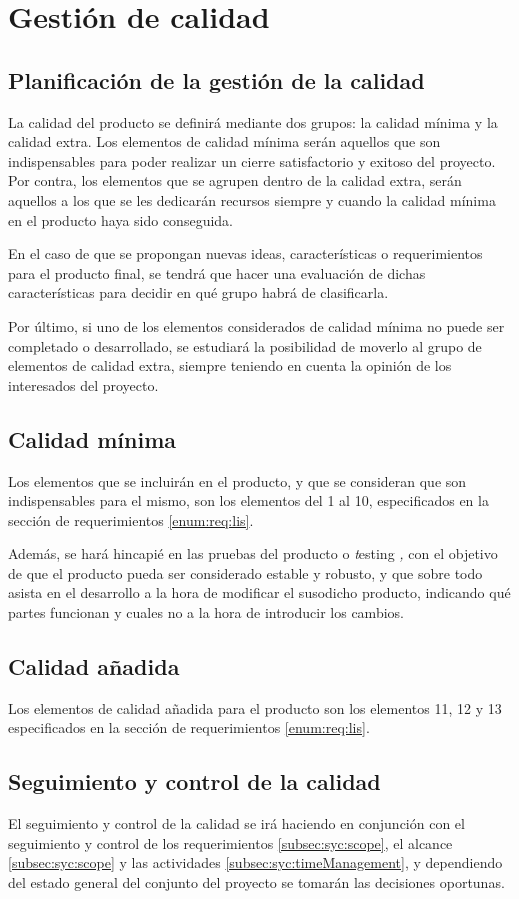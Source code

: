 \section{Gestión de calidad}
\subsection{Planificación de la gestión de la calidad}
La calidad del producto se definirá mediante dos grupos: la calidad
mínima y la calidad extra. Los elementos de calidad mínima serán
aquellos que son indispensables para poder realizar un cierre
satisfactorio y exitoso del proyecto. Por contra, los elementos que se
agrupen dentro de la calidad extra, serán aquellos a los que se les
dedicarán recursos siempre y cuando la calidad mínima en el producto
haya sido conseguida.

En el caso de que se propongan nuevas ideas, características o
requerimientos para el producto final, se tendrá que hacer una
evaluación de dichas características para decidir en qué grupo habrá de
clasificarla.

Por último, si uno de los elementos considerados de calidad mínima no
puede ser completado o desarrollado, se estudiará la posibilidad de
moverlo al grupo de elementos de calidad extra, siempre teniendo en
cuenta la opinión de los interesados del proyecto.

\subsection{Calidad mínima}
\label{sec:min:qual}
Los elementos que se incluirán en el producto, y que se consideran que
son indispensables para el mismo, son los elementos del 1 al 10, especificados 
en la sección de requerimientos \ref{enum:req:lis}.

Además, se hará hincapié en las pruebas del producto o \textit testing \textit,
con el objetivo de que el producto pueda ser considerado estable y robusto, y
que sobre todo asista en el desarrollo a la hora de modificar el susodicho
producto, indicando qué partes funcionan y cuales no a la hora de introducir
los cambios.

\subsection{Calidad añadida}
\label{sec:add:qual}
Los elementos de calidad añadida para el producto son los elementos 11,
12 y 13 especificados en la sección de requerimientos \ref{enum:req:lis}.

\subsection{Seguimiento y control de la calidad}
El seguimiento y control de la calidad se irá haciendo en conjunción con
el seguimiento y control de los requerimientos \ref{subsec:syc:scope},
el alcance \ref{subsec:syc:scope} y las actividades
\ref{subsec:syc:timeManagement}, y dependiendo del estado general del
conjunto del proyecto se tomarán las decisiones oportunas.
